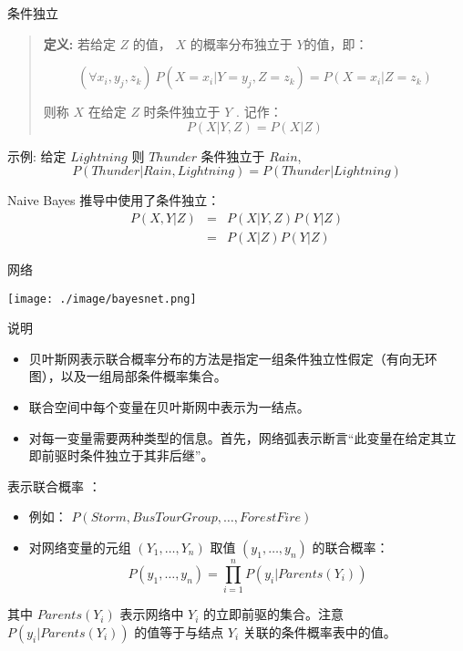 \documentclass[presentation]{beamer}
\begin{document}
\begin{frame}[label={sec:org307972a}]{条件独立}
\begin{quote}
{\bf 定义:} 若给定 $Z$ 的值， $X$ 的概率分布独立于 $Y$的值，即：

$$(\forall x_i,y_j,z_k) \ P(X = x_i | Y = y_j, Z = z_k) =   P(X = x_i | Z = z_k)$$

则称 $X$ 在给定 $Z$ 时条件独立于 $Y$ . 记作：
$$P(X | Y,Z) = P(X | Z)$$
\end{quote}
\end{frame}

\begin{frame}[label={sec:orga6bf7da}]{示例:}
给定 \(Lightning\) 则 \(Thunder\) 条件独立于 \(Rain\), 
$$P(Thunder | Rain, Lightning) = P(Thunder | Lightning)$$

Naive Bayes 推导中使用了条件独立：
\begin{eqnarray}
P(X,Y|Z) &= &P(X|Y,Z) P(Y|Z)  \nonumber \\
 &= &P(X|Z) P(Y|Z)  \nonumber
\end{eqnarray}
\end{frame}

\begin{frame}[label={sec:org602ef85}]{网络}
\begin{center}
\texttt{[image: ./image/bayesnet.png]}
\end{center}
\end{frame}

\begin{frame}[label={sec:orgeaafc47}]{说明}
\begin{itemize}
\item 贝叶斯网表示联合概率分布的方法是指定一组条件独立性假定（有向无环图），以及一组局部条件概率集合。

\item 联合空间中每个变量在贝叶斯网中表示为一结点。
\item 对每一变量需要两种类型的信息。首先，网络弧表示断言“此变量在给定其立即前驱时条件独立于其非后继”。
\end{itemize}
\end{frame}

\begin{frame}[label={sec:org0b53e03}]{表示联合概率 ：}
\begin{itemize}
\item 例如： \(P(Storm, BusTourGroup, \ldots, ForestFire)\)
\item 对网络变量的元组 \((Y_1, \ldots, Y_n)\) 取值 \((y_1, \ldots, y_n)\) 的联合概率：
$$P(y_1, \ldots, y_n) = \prod_{i=1}^{n} P(y_i | Parents(Y_i))$$
\end{itemize}
其中 \(Parents(Y_i)\) 表示网络中 \(Y_i\) 的立即前驱的集合。注意 \(P(y_i|Parents(Y_i))\) 的值等于与结点 \(Y_i\) 关联的条件概率表中的值。
\end{frame}
\end{document}
